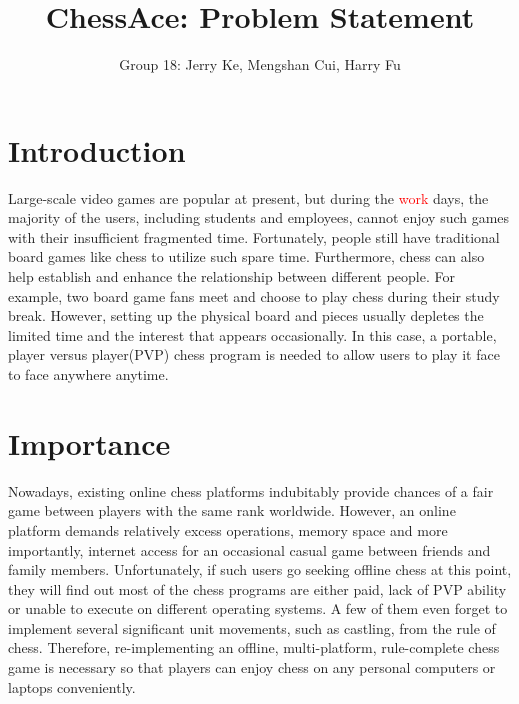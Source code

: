 \documentclass[12pt,letterpaper]{article}
\title{ChessAce: Problem Statement}
\author{Group 18: Jerry Ke, Mengshan Cui, Harry Fu}
\date{}
\begin{document}
\maketitle
\section{Introduction}
Large-scale video games are popular at present, but during the \textcolor{red}{work} days, the majority of the users, including students and employees, cannot enjoy such games with their insufficient fragmented time. Fortunately, people still have traditional board games like chess to utilize such spare time. Furthermore, chess can also help establish and enhance the relationship between different people. For example, two board game fans meet and choose to play chess during their study break. However, setting up the physical board and pieces usually depletes the limited time and the interest that appears occasionally. In this case, a portable, player versus player(PVP) chess program is needed to allow users to play it face to face anywhere anytime. 

\section{Importance}
Nowadays, existing online chess platforms indubitably provide chances of a fair game between players with the same rank worldwide. However, an online platform demands relatively excess operations, memory space and more importantly, internet access for an occasional casual game between friends and family members. 
\medskip
\newline
Unfortunately, if such users go seeking offline chess at this point, they will find out most of the chess programs are either paid, lack of PVP ability or unable to execute on different operating systems. A few of them even forget to implement several significant unit movements, such as castling, from the rule of chess. 
Therefore, re-implementing an offline, multi-platform, rule-complete chess game is necessary so that players can enjoy chess on any personal computers or laptops conveniently. 
\end{document}
